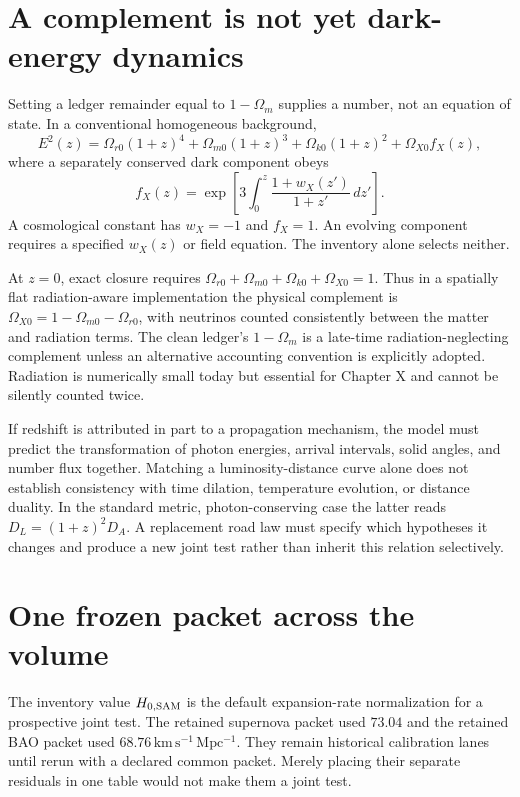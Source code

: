 \section{A complement is not yet dark-energy dynamics}
Setting a ledger remainder equal to $1-\Omega_m$ supplies a number, not an equation of state. In a conventional homogeneous background,
\begin{equation}
 E^2(z)=\Omega_{r0}(1+z)^4+\Omega_{m0}(1+z)^3
 +\Omega_{k0}(1+z)^2+\Omega_{X0}f_X(z),
 \label{c8:background}
\end{equation}
where a separately conserved dark component obeys
\begin{equation}
 f_X(z)=\exp\left[3\int_0^z\frac{1+w_X(z')}{1+z'}\,dz'\right].
 \label{c8:darkevolution}
\end{equation}
A cosmological constant has $w_X=-1$ and $f_X=1$. An evolving component requires a specified $w_X(z)$ or field equation. The inventory alone selects neither.

At $z=0$, exact closure requires $\Omega_{r0}+\Omega_{m0}+\Omega_{k0}+\Omega_{X0}=1$. Thus in a spatially flat radiation-aware implementation the physical complement is $\Omega_{X0}=1-\Omega_{m0}-\Omega_{r0}$, with neutrinos counted consistently between the matter and radiation terms. The clean ledger's $1-\Omega_m$ is a late-time radiation-neglecting complement unless an alternative accounting convention is explicitly adopted. Radiation is numerically small today but essential for Chapter X and cannot be silently counted twice.

If redshift is attributed in part to a propagation mechanism, the model must predict the transformation of photon energies, arrival intervals, solid angles, and number flux together. Matching a luminosity-distance curve alone does not establish consistency with time dilation, temperature evolution, or distance duality. In the standard metric, photon-conserving case the latter reads $D_L=(1+z)^2D_A$. A replacement road law must specify which hypotheses it changes and produce a new joint test rather than inherit this relation selectively.

\section{One frozen packet across the volume}
The inventory value $H_{0,\rm SAM}$ is the default expansion-rate normalization for a prospective joint test. The retained supernova packet used $73.04$ and the retained BAO packet used $68.76\,\mathrm{km\,s^{-1}\,Mpc^{-1}}$. They remain historical calibration lanes until rerun with a declared common packet. Merely placing their separate residuals in one table would not make them a joint test.


